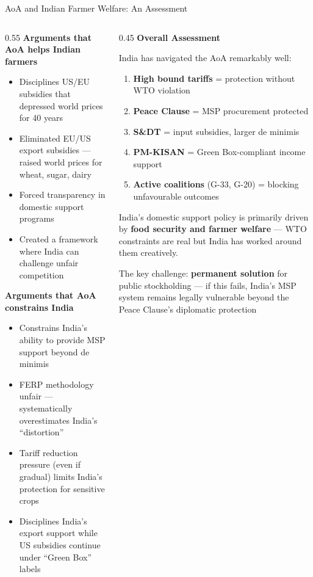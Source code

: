 \documentclass[
  ignorenonframetext,
  aspectratio=169,
]{beamer}
\makeatletter
\providecommand{\tightlist}{%
  \setlength{\itemsep}{0pt}\setlength{\parskip}{0pt}}
\let\quarto@originallabel\label
\DeclareRobustCommand*{\label}[1]{\quarto@originallabel{#1}}
\makeatother
\begin{document}
\begin{frame}{AoA and Indian Farmer Welfare: An Assessment}
\label{aoa-and-indian-farmer-welfare-an-assessment}
\begin{columns}[T]
\begin{column}{0.55\linewidth}
\textbf{Arguments that AoA helps Indian farmers}

\begin{itemize}
\tightlist
\item
  Disciplines US/EU subsidies that depressed world prices for 40 years
\item
  Eliminated EU/US export subsidies --- raised world prices for wheat,
  sugar, dairy
\item
  Forced transparency in domestic support programs
\item
  Created a framework where India can challenge unfair competition
\end{itemize}

\textbf{Arguments that AoA constrains India}

\begin{itemize}
\tightlist
\item
  Constrains India's ability to provide MSP support beyond de minimis
\item
  FERP methodology unfair --- systematically overestimates India's
  ``distortion''
\item
  Tariff reduction pressure (even if gradual) limits India's protection
  for sensitive crops
\item
  Disciplines India's export support while US subsidies continue under
  ``Green Box'' labels
\end{itemize}
\end{column}

\begin{column}{0.45\linewidth}
\textbf{Overall Assessment}

India has navigated the AoA remarkably well:

\begin{enumerate}
\tightlist
\item
  \textbf{High bound tariffs} = protection without WTO violation
\item
  \textbf{Peace Clause} = MSP procurement protected
\item
  \textbf{S\&DT} = input subsidies, larger de minimis
\item
  \textbf{PM-KISAN} = Green Box-compliant income support
\item
  \textbf{Active coalitions} (G-33, G-20) = blocking unfavourable
  outcomes
\end{enumerate}

India's domestic support policy is primarily driven by \textbf{food
security and farmer welfare} --- WTO constraints are real but India has
worked around them creatively.

The key challenge: \textbf{permanent solution} for public stockholding
--- if this fails, India's MSP system remains legally vulnerable beyond
the Peace Clause's diplomatic protection
\end{column}
\end{columns}
\end{frame}
\end{document}
